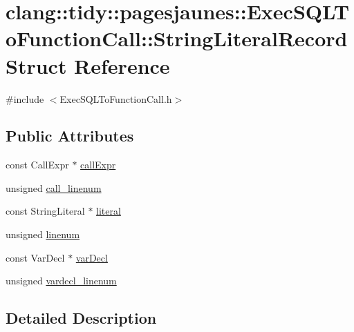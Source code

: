 \hypertarget{structclang_1_1tidy_1_1pagesjaunes_1_1_exec_s_q_l_to_function_call_1_1_string_literal_record}{}\section{clang\+:\+:tidy\+:\+:pagesjaunes\+:\+:Exec\+S\+Q\+L\+To\+Function\+Call\+:\+:String\+Literal\+Record Struct Reference}
\label{structclang_1_1tidy_1_1pagesjaunes_1_1_exec_s_q_l_to_function_call_1_1_string_literal_record}


{\ttfamily \#include $<$Exec\+S\+Q\+L\+To\+Function\+Call.\+h$>$}

\subsection*{Public Attributes}
\begin{DoxyCompactItemize}
\item 
const Call\+Expr $\ast$ \hyperlink{structclang_1_1tidy_1_1pagesjaunes_1_1_exec_s_q_l_to_function_call_1_1_string_literal_record_a3cdb5126c3a2579db27a81f1badc3543}{call\+Expr}
\item 
unsigned \hyperlink{structclang_1_1tidy_1_1pagesjaunes_1_1_exec_s_q_l_to_function_call_1_1_string_literal_record_ab3a63831999a78c4ac45a1c54d350cae}{call\+\_\+linenum}
\item 
const String\+Literal $\ast$ \hyperlink{structclang_1_1tidy_1_1pagesjaunes_1_1_exec_s_q_l_to_function_call_1_1_string_literal_record_a761da338ffa2e2ea4ca6812db287637b}{literal}
\item 
unsigned \hyperlink{structclang_1_1tidy_1_1pagesjaunes_1_1_exec_s_q_l_to_function_call_1_1_string_literal_record_a4d009753f33cad73f401501235efb028}{linenum}
\item 
const Var\+Decl $\ast$ \hyperlink{structclang_1_1tidy_1_1pagesjaunes_1_1_exec_s_q_l_to_function_call_1_1_string_literal_record_ac44bf0bab5e87779ad88ed368425360e}{var\+Decl}
\item 
unsigned \hyperlink{structclang_1_1tidy_1_1pagesjaunes_1_1_exec_s_q_l_to_function_call_1_1_string_literal_record_a8e7ecc56f4cb8719468418efbcf45bb3}{vardecl\+\_\+linenum}
\end{DoxyCompactItemize}


\subsection{Detailed Description}


